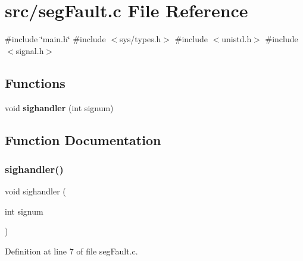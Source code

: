 \section{src/seg\+Fault.c File Reference}
\label{seg_fault_8c}
{\ttfamily \#include \char`\"{}main.\+h\char`\"{}}\newline
{\ttfamily \#include $<$sys/types.\+h$>$}\newline
{\ttfamily \#include $<$unistd.\+h$>$}\newline
{\ttfamily \#include $<$signal.\+h$>$}\newline
\subsection*{Functions}
\begin{DoxyCompactItemize}
\item 
void \textbf{ sighandler} (int signum)
\end{DoxyCompactItemize}


\subsection{Function Documentation}
\mbox{\label{seg_fault_8c_ae9fa379677100866fa335a0b8adf3ea2}} 
\subsubsection{sighandler()}
{\footnotesize\ttfamily void sighandler (\begin{DoxyParamCaption}\item[{int}]{signum }\end{DoxyParamCaption})}



Definition at line 7 of file seg\+Fault.\+c.

